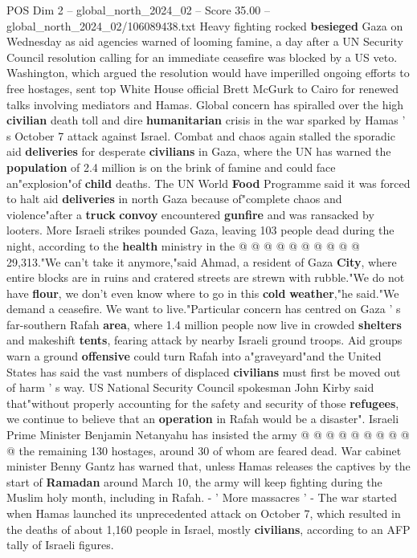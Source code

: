 \begin{textsample}{POS Dim 2 – global\_north\_2024\_02 – Score 35.00 – global\_north\_2024\_02/106089438.txt}  \label{ex:f2_pos_142}
Heavy fighting rocked \textbf{besieged} Gaza on Wednesday as aid agencies warned of looming famine, a day after a UN Security Council resolution calling for an immediate ceasefire was blocked by a US veto.
Washington, which argued the resolution would have imperilled ongoing efforts to free hostages, sent top White House official Brett McGurk to Cairo for renewed talks involving mediators and Hamas.
Global concern has spiralled over the high \textbf{civilian} death toll and dire \textbf{humanitarian} crisis in the war sparked by Hamas ' s October 7 attack against Israel.
Combat and chaos again stalled the sporadic aid \textbf{deliveries} for desperate \textbf{civilians} in Gaza, where the UN has warned the \textbf{population} of 2.4 million is on the brink of famine and could face an"explosion"of \textbf{child} deaths.
The UN World \textbf{Food} Programme said it was forced to halt aid \textbf{deliveries} in north Gaza because of"complete chaos and violence"after a \textbf{truck} \textbf{convoy} encountered \textbf{gunfire} and was ransacked by looters.
More Israeli strikes pounded Gaza, leaving 103 people dead during the night, according to the \textbf{health} ministry in the @ @ @ @ @ @ @ @ @ @ 29,313."We can't take it anymore,"said Ahmad, a resident of Gaza \textbf{City}, where entire blocks are in ruins and cratered streets are strewn with rubble."We do not have \textbf{flour}, we don't even know where to go in this \textbf{cold} \textbf{weather},"he said."We demand a ceasefire.
We want to live."Particular concern has centred on Gaza ' s far-southern Rafah \textbf{area}, where 1.4 million people now live in crowded \textbf{shelters} and makeshift \textbf{tents}, fearing attack by nearby Israeli ground troops.
Aid groups warn a ground \textbf{offensive} could turn Rafah into a"graveyard"and the United States has said the vast numbers of displaced \textbf{civilians} must first be moved out of harm ' s way.
US National Security Council spokesman John Kirby said that"without properly accounting for the safety and security of those \textbf{refugees}, we continue to believe that an \textbf{operation} in Rafah would be a disaster".
Israeli Prime Minister Benjamin Netanyahu has insisted the army @ @ @ @ @ @ @ @ @ @ the remaining 130 hostages, around 30 of whom are feared dead.
War cabinet minister Benny Gantz has warned that, unless Hamas releases the captives by the start of \textbf{Ramadan} around March 10, the army will keep fighting during the Muslim holy month, including in Rafah. - ' More massacres ' - The war started when Hamas launched its unprecedented attack on October 7, which resulted in the deaths of about 1,160 people in Israel, mostly \textbf{civilians}, according to an AFP tally of Israeli figures.

\end{textsample}
